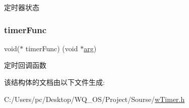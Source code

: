 定时器状态 \mbox{\label{struct__w_timer_info_a5b39f4308b8e715d9278cbf70f7297c7}} 
\subsubsection{\texorpdfstring{timer\+Func}{timerFunc}}
{\footnotesize\ttfamily void($\ast$ timer\+Func) (void $\ast$\mbox{\hyperlink{struct__w_timer_info_a9ce2ec4812a92cb6ab39f6e81e9173a9}{arg}})}

定时回调函数 

该结构体的文档由以下文件生成\+:\begin{DoxyCompactItemize}
\item 
C\+:/\+Users/pc/\+Desktop/\+W\+Q\+\_\+\+O\+S/\+Project/\+Sourse/\mbox{\hyperlink{w_timer_8h}{w\+Timer.\+h}}\end{DoxyCompactItemize}

